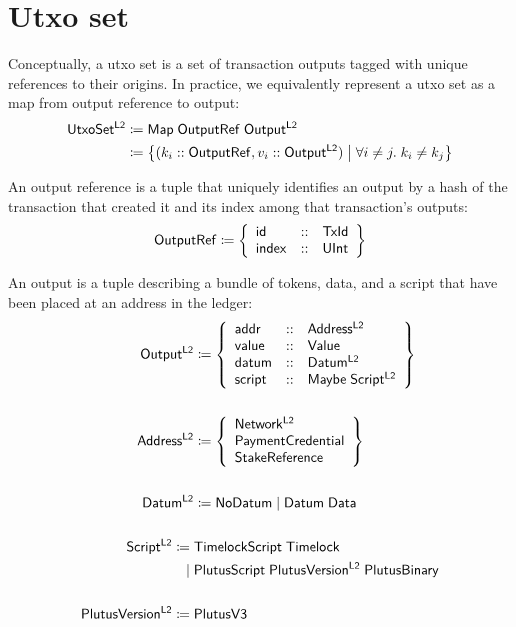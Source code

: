 \documentclass[../hydrozoa.tex]{subfiles}
\begin{document}
\section{Utxo set}%
\label{h:l2-utxo-set}%

Conceptually, a utxo set is a set of transaction outputs tagged with unique references to their origins.
In practice, we equivalently represent a utxo set as a map from output reference to output:
\begin{equation*}
\begin{split}
  \mathsf{UtxoSet^{L2}} &\coloneq \mathsf{Map} \; \mathsf{OutputRef} \; \mathsf{Output^{L2}} \\
    &\coloneq \left\{
      (k_i :: \mathsf{OutputRef}, v_i :: \mathsf{Output^{L2}})
      \;\middle|\;
      \forall i \neq j.\; k_i \neq k_j
    \right\}
\end{split}
\end{equation*}

An output reference is a tuple that uniquely identifies an output by a hash of the transaction that created it and its index among that transaction's outputs:
\begin{equation*}
  \mathsf{OutputRef} \coloneq \left\{
    \begin{array}{lll}
      \mathsf{id} &::& \mathsf{TxId} \\
      \mathsf{index} &::& \mathsf{UInt}
    \end{array} \right\}
\end{equation*}

An output is a tuple describing a bundle of tokens, data, and a script that have been placed at an address in the ledger:
\begin{equation*}
\begin{split}
  \mathsf{Output^{L2}} &\coloneq \left\{
  \begin{array}{lll}
    \mathsf{addr} &::& \mathsf{Address^{L2}} \\
      \mathsf{value} &::& \mathsf{Value} \\
      \mathsf{datum} &::& \mathsf{Datum^{L2}} \\
      \mathsf{script} &::& \mathsf{Maybe} \; \mathsf{Script^{L2}}
  \end{array} \right\} \\\\
  \mathsf{Address^{L2}} &\coloneq \left\{
    \begin{array}{l}
      \mathsf{Network^{L2}} \\
      \mathsf{PaymentCredential} \\
      \mathsf{StakeReference}
    \end{array}\right\} \\\\
  \mathsf{Datum^{L2}} &\coloneq \mathsf{NoDatum} \mid \mathsf{Datum} \; \mathsf{Data} \\\\
  \mathsf{Script^{L2}} \coloneq\;& \mathsf{TimelockScript} \; \mathsf{Timelock} \\
                        \mid\;& \mathsf{PlutusScript} \; \mathsf{PlutusVersion^{L2}} \; \mathsf{PlutusBinary} \\\\
  \mathsf{PlutusVersion^{L2}} \coloneq\;& \mathsf{PlutusV3}
\end{split}
\end{equation*}
\end{document}
